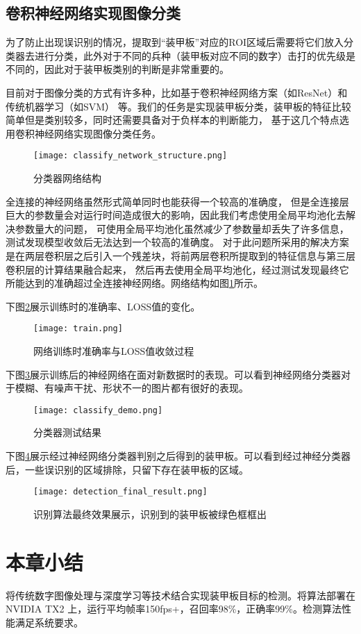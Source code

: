 \subsection{卷积神经网络实现图像分类}

为了防止出现误识别的情况，提取到“装甲板”对应的ROI区域后需要将它们放入分类器去进行分类，此外对于不同的兵种（装甲板对应不同的数字）击打的优先级是不同的，因此对于装甲板类别的判断是非常重要的。\par
目前对于图像分类的方式有许多种，比如基于卷积神经网络方案（如ResNet\cite{2016Deep}）和传统机器学习（如SVM）
等。我们的任务是实现装甲板分类，装甲板的特征比较简单但是类别较多，同时还需要具备对于负样本的判断能力，
基于这几个特点选用卷积神经网络实现图像分类任务。
\begin{figure}[H]
    \centering
    \texttt{[image: classify\_network\_structure.png]} 
    \caption{分类器网络结构} 
    \label{分类器网络结构}
\end{figure}
全连接的神经网络虽然形式简单同时也能获得一个较高的准确度，
但是全连接层巨大的参数量会对运行时间造成很大的影响，因此我们考虑使用全局平均池化去解决参数量大的问题，
可使用全局平均池化虽然减少了参数量却丢失了许多信息，测试发现模型收敛后无法达到一个较高的准确度。
对于此问题所采用的解决方案是在两层卷积层之后引入一个残差块，将前两层卷积所提取到的特征信息与第三层卷积层的计算结果融合起来，
然后再去使用全局平均池化，经过测试发现最终它所能达到的准确超过全连接神经网络。网络结构如图\ref{分类器网络结构}所示。


下图\ref{网络训练时准确率与LOSS值收敛过程}展示训练时的准确率、LOSS值的变化。
\begin{figure}[H]
    \centering
    \texttt{[image: train.png]} 
    \caption{网络训练时准确率与LOSS值收敛过程} 
    \label{网络训练时准确率与LOSS值收敛过程}
\end{figure}


下图\ref{分类器测试结果}展示训练后的神经网络在面对新数据时的表现。可以看到神经网络分类器对于模糊、有噪声干扰、形状不一的图片都有很好的表现。
\begin{figure}[H]
    \centering
    \texttt{[image: classify\_demo.png]} 
    \caption{分类器测试结果} 
    \label{分类器测试结果}
\end{figure}

下图\ref{识别算法最终效果展示}展示经过神经网络分类器判别之后得到的装甲板。可以看到经过神经分类器后，一些误识别的区域排除，只留下存在装甲板的区域。
\begin{figure}[H]
    \centering
    \texttt{[image: detection\_final\_result.png]} 
    \caption{识别算法最终效果展示，识别到的装甲板被绿色框框出} 
    \label{识别算法最终效果展示}
\end{figure}

\section{本章小结}
将传统数字图像处理与深度学习等技术结合实现装甲板目标的检测。将算法部署在NVIDIA TX2 上，运行平均帧率150fps+，召回率98\%，正确率99\%。检测算法性能满足系统要求。



